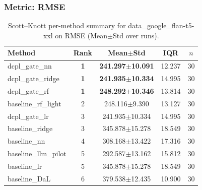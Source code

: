 \subsubsection*{Metric: RMSE}
\begin{table}[H]
\centering
\scriptsize
\setlength{\tabcolsep}{4pt}
\renewcommand{\arraystretch}{1.1}
\caption{Scott--Knott per-method summary for data\_google\_flan-t5-xxl on RMSE (Mean$\pm$Std over runs).}
\label{tab:sk_data_google_flan-t5-xxl_RMSE}
\begin{tabular}{l|c|c|c|c}
\hline
\textbf{Method} & \textbf{Rank} & \textbf{Mean$\pm$Std} & \textbf{IQR} & \textbf{$n$} \\
\hline
\rowcolor{red!15} dcpl\_gate\_nn & \textbf{1} & \textbf{241.297$\pm$10.091} & 12.237 & 30 \\
\rowcolor{red!15} dcpl\_gate\_ridge & \textbf{1} & \textbf{241.935$\pm$10.334} & 14.995 & 30 \\
\rowcolor{red!15} dcpl\_gate\_rf & \textbf{1} & \textbf{248.292$\pm$10.346} & 13.814 & 30 \\
baseline\_rf\_light & 2 & 248.116$\pm$9.390 & 13.127 & 30 \\
dcpl\_gate\_lr & 3 & 241.935$\pm$10.334 & 14.995 & 30 \\
baseline\_ridge & 3 & 345.878$\pm$15.278 & 18.549 & 30 \\
baseline\_nn & 4 & 308.168$\pm$13.422 & 17.316 & 30 \\
baseline\_llm\_pilot & 5 & 292.587$\pm$13.162 & 15.812 & 30 \\
baseline\_lr & 5 & 345.878$\pm$15.278 & 18.549 & 30 \\
baseline\_DaL & 6 & 379.538$\pm$12.435 & 10.900 & 30 \\
\hline
\end{tabular}
\end{table}

